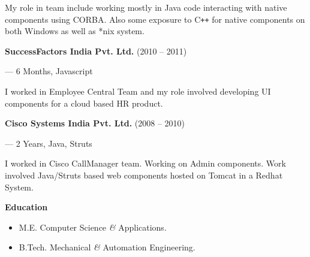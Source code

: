 \documentclass{article}
\begin{document}
   My role in team include working mostly in Java code interacting with native components using CORBA. Also some exposure to C{}\verb!++! for native components on both Windows as well as *nix system.
\begin{center}
   {\bf SuccessFactors India Pvt. Ltd.} (2010 -- 2011)\\ 
\end{center}
\begin{flushright}--- 6 Months, Javascript\end{flushright}
   I worked in Employee Central Team and my role involved developing UI components for a cloud based HR product.
\begin{center}
   {\bf Cisco Systems India Pvt. Ltd.} (2008 -- 2010)\\
\end{center}
\begin{flushright} --- 2\myhalf{} Years, Java, Struts \end{flushright}
   I worked in Cisco CallManager team. Working on Admin components. Work involved Java/Struts based web components hosted on Tomcat in a Redhat System.
\begin{flushleft}
\large\bf{Education}
\end{flushleft}
\begin{itemize}
\item M.E. Computer Science {\it\&} Applications.
\item  B.Tech. Mechanical {\it\&} Automation Engineering.
\end{itemize}
\vfill
\hrulefill
\end{document}
